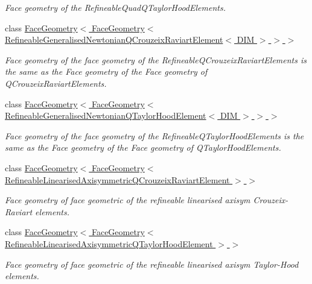 \begin{DoxyCompactItemize}
\begin{DoxyCompactList}\small\item\em Face geometry of the Refineable\+Quad\+Q\+Taylor\+Hood\+Elements. \end{DoxyCompactList}\item 
class \hyperlink{classoomph_1_1FaceGeometry_3_01FaceGeometry_3_01RefineableGeneralisedNewtonianQCrouzeixRaviartElement_3_01DIM_01_4_01_4_01_4}{Face\+Geometry$<$ Face\+Geometry$<$ Refineable\+Generalised\+Newtonian\+Q\+Crouzeix\+Raviart\+Element$<$ D\+I\+M $>$ $>$ $>$}
\begin{DoxyCompactList}\small\item\em Face geometry of the face geometry of the Refineable\+Q\+Crouzeix\+Raviart\+Elements is the same as the Face geometry of the Face geometry of Q\+Crouzeix\+Raviart\+Elements. \end{DoxyCompactList}\item 
class \hyperlink{classoomph_1_1FaceGeometry_3_01FaceGeometry_3_01RefineableGeneralisedNewtonianQTaylorHoodElement_3_01DIM_01_4_01_4_01_4}{Face\+Geometry$<$ Face\+Geometry$<$ Refineable\+Generalised\+Newtonian\+Q\+Taylor\+Hood\+Element$<$ D\+I\+M $>$ $>$ $>$}
\begin{DoxyCompactList}\small\item\em Face geometry of the face geometry of the Refineable\+Q\+Taylor\+Hood\+Elements is the same as the Face geometry of the Face geometry of Q\+Taylor\+Hood\+Elements. \end{DoxyCompactList}\item 
class \hyperlink{classoomph_1_1FaceGeometry_3_01FaceGeometry_3_01RefineableLinearisedAxisymmetricQCrouzeixRaviartElement_01_4_01_4}{Face\+Geometry$<$ Face\+Geometry$<$ Refineable\+Linearised\+Axisymmetric\+Q\+Crouzeix\+Raviart\+Element $>$ $>$}
\begin{DoxyCompactList}\small\item\em Face geometry of face geometric of the refineable linearised axisym Crouzeix-\/\+Raviart elements. \end{DoxyCompactList}\item 
class \hyperlink{classoomph_1_1FaceGeometry_3_01FaceGeometry_3_01RefineableLinearisedAxisymmetricQTaylorHoodElement_01_4_01_4}{Face\+Geometry$<$ Face\+Geometry$<$ Refineable\+Linearised\+Axisymmetric\+Q\+Taylor\+Hood\+Element $>$ $>$}
\begin{DoxyCompactList}\small\item\em Face geometry of face geometric of the refineable linearised axisym Taylor-\/\+Hood elements. \end{DoxyCompactList}\item 

\end{DoxyCompactItemize}
